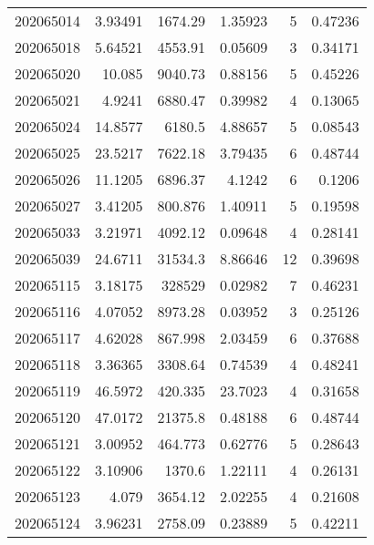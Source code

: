 \begin{tabular}{rrrrrr}
 202065014 &          3.93491 &     1674.29   &            1.35923 &           5 & 0.47236 \\
 202065018 &          5.64521 &     4553.91   &            0.05609 &           3 & 0.34171 \\
 202065020 &         10.085   &     9040.73   &            0.88156 &           5 & 0.45226 \\
 202065021 &          4.9241  &     6880.47   &            0.39982 &           4 & 0.13065 \\
 202065024 &         14.8577  &     6180.5    &            4.88657 &           5 & 0.08543 \\
 202065025 &         23.5217  &     7622.18   &            3.79435 &           6 & 0.48744 \\
 202065026 &         11.1205  &     6896.37   &            4.1242  &           6 & 0.1206  \\
 202065027 &          3.41205 &      800.876  &            1.40911 &           5 & 0.19598 \\
 202065033 &          3.21971 &     4092.12   &            0.09648 &           4 & 0.28141 \\
 202065039 &         24.6711  &    31534.3    &            8.86646 &          12 & 0.39698 \\
 202065115 &          3.18175 &   328529      &            0.02982 &           7 & 0.46231 \\
 202065116 &          4.07052 &     8973.28   &            0.03952 &           3 & 0.25126 \\
 202065117 &          4.62028 &      867.998  &            2.03459 &           6 & 0.37688 \\
 202065118 &          3.36365 &     3308.64   &            0.74539 &           4 & 0.48241 \\
 202065119 &         46.5972  &      420.335  &           23.7023  &           4 & 0.31658 \\
 202065120 &         47.0172  &    21375.8    &            0.48188 &           6 & 0.48744 \\
 202065121 &          3.00952 &      464.773  &            0.62776 &           5 & 0.28643 \\
 202065122 &          3.10906 &     1370.6    &            1.22111 &           4 & 0.26131 \\
 202065123 &          4.079   &     3654.12   &            2.02255 &           4 & 0.21608 \\
 202065124 &          3.96231 &     2758.09   &            0.23889 &           5 & 0.42211 \\

\end{tabular}
